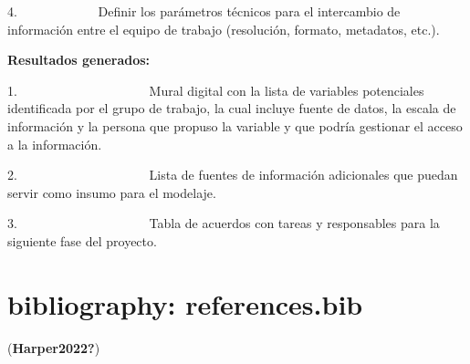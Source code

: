 \documentclass[
  letterpaper,
  DIV=11,
  numbers=noendperiod]{scrreprt}
\begin{document}
4.~~~~~~~~~~~~ Definir los parámetros técnicos para el intercambio de
información entre el equipo de trabajo (resolución, formato, metadatos,
etc.).

\textbf{Resultados generados:}

1.~~~~~~~~~~~~~~~~~~~~ Mural digital con la lista de variables
potenciales identificada por el grupo de trabajo, la cual incluye fuente
de datos, la escala de información y la persona que propuso la variable
y que podría gestionar el acceso a la información.

2.~~~~~~~~~~~~~~~~~~~~ Lista de fuentes de información adicionales que
puedan servir como insumo para el modelaje.

3.~~~~~~~~~~~~~~~~~~~~ Tabla de acuerdos con tareas y responsables para
la siguiente fase del proyecto.

\hypertarget{bibliography-references.bib}{%
\section{bibliography:
references.bib}\label{bibliography-references.bib}}

(\textbf{Harper2022?})
\end{document}
